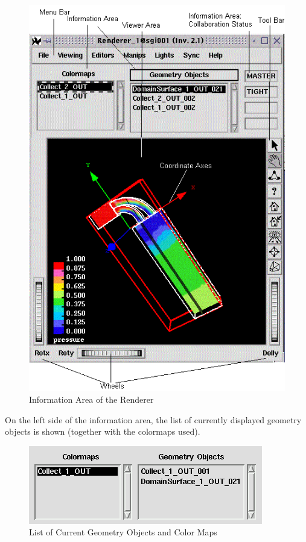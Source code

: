  \latexonly
 \begin{figure}[htp]
  \begin{center}
   \includegraphics[scale=0.7]{renderer/pict/general}
   \caption{Information Area of the Renderer}
	\label{fig73}
  \end{center}
 \end{figure}
 \endlatexonly

On the left side of the information area, the list of currently displayed geometry objects is shown
(together with the colormaps used).

 \latexonly
 \begin{figure}[htp]
  \begin{center}
   \includegraphics[scale=0.7]{renderer/pict/image28}
   \caption{List of Current Geometry Objects and Color Maps}
	\label{fig74}
  \end{center}
 \end{figure}
 \endlatexonly
 
